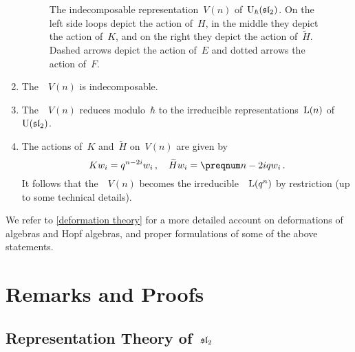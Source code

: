 \documentclass[a4paper, 11pt, oneside]{scrartcl}
\begin{document}
\begin{theorem}
\begin{enumerate}
\begin{figure}
\begin{center}
        \end{center}
        \caption{%
          The indecomposable representation~$V(n)$ of~$\operatorname{U}_{\hbar}(\mathfrak{sl}_2)$.
          On the left side loops depict the action of~$H$, in the middle they depict the action of~$K$, and on the right they depict the action of~$\widetilde{H}$.
          Dashed arrows depict the action of~$E$ and dotted arrows the action of~$F$.
        }
        \label{graphical representation of deformed representations}
      \end{figure}
    \item
      The~~$V(n)$ is indecomposable.
    \item
      The~~$V(n)$ reduces modulo~$\hbar$ to the irreducible representations~$\operatorname{L}(n)$ of~$\operatorname{U}(\mathfrak{sl}_2)$.
    \item
      The actions of~$K$ and~$\widetilde{H}$ on~$V(n)$ are given by
      \[
        K w_i
        =
        q^{n - 2i} w_i \,,
        \quad
        \widetilde{H} w_i
        =
        \qnum{n - 2i} w_i \,.
      \]
      It follows that the~~$V(n)$ becomes the irreducible~~$\operatorname{L}(q^n)$ by restriction (up to some technical details).
  \end{enumerate}
\end{theorem}

We refer to \cref{deformation theory} for a more detailed account on deformations of algebras and Hopf algebras, and proper formulations of some of the above statements.





\clearpage
\appendix





\section{Remarks and Proofs}



\subsection{Representation Theory of~\texorpdfstring{$\mathfrak{sl}_2$}{sl2}}
\label{appendix representation theory of sl2}
\end{document}

